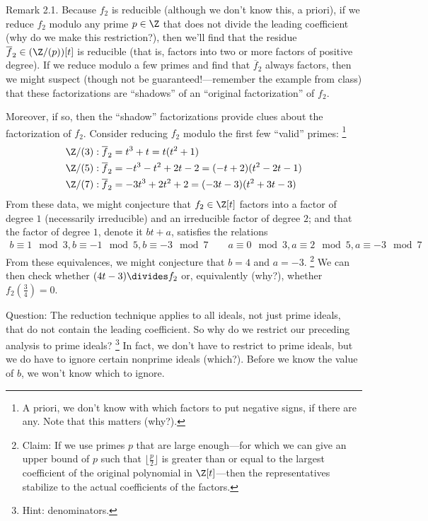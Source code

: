 {Remark 2.1. Because $f_{2}$ is reducible (although we don't know this, a priori), if we reduce $f_{2}$ modulo any prime $p \in \Z$ that does not divide the leading coefficient (why do we make this restriction?), then we'll find that the residue $\overline{f}_{2} \in (\Z / (p))[t]$ is reducible (that is, factors into two or more factors of positive degree). If we reduce modulo a few primes and find that $\overline{f}_{2}$ always factors, then we might suspect (though not be guaranteed!---remember the example from class) that these factorizations are ``shadows'' of an ``original factorization'' of $f_{2}$.

Moreover, if so, then the ``shadow'' factorizations provide clues about the factorization of $f_{2}$. Consider reducing $f_{2}$ modulo the first few ``valid'' primes:%
\footnote{A priori, we don't know with which factors to put negative signs, if there are any. Note that this matters (why?).}%
\begin{align*}
\Z / (3)
:
\overline{f}_{2}
&=
t^{3} + t
=
t (t^{2} + 1)
\\
\Z / (5)
:
\overline{f}_{2}
&=
-t^{3} - t^{2} + 2 t - 2
=
(-t + 2) (t^{2} - 2 t - 1)
\\
\Z / (7)
:
\overline{f}_{2}
&=
-3 t^{3} + 2 t^{2} + 2
=
(-3 t - 3) (t^{2} + 3 t - 3)
\end{align*}
From these data, we might conjecture that $f_{2} \in \Z[t]$ factors into a factor of degree $1$ (necessarily irreducible) and an irreducible factor of degree $2$; and that the factor of degree $1$, denote it $b t + a$, satisfies the relations
\begin{align*}
b
\equiv
1
\mod 3,
b
\equiv
-1
\mod 5,
b
\equiv
-3
\mod 7
\qquad
a
\equiv
0
\mod 3,
a
\equiv
2
\mod 5,
a
\equiv
-3
\mod 7
\end{align*}
From these equivalences, we might conjecture that $b = 4$ and $a = -3$.%
\footnote{Claim: If we use primes $p$ that are large enough---for which we can give an upper bound of $p$ such that $\lfloor{}\frac{p}{2}\rfloor{}$ is greater than or equal to the largest coefficient of the original polynomial in $\Z[t]$---then the representatives stabilize to the actual coefficients of the factors.} %
We can then check whether $(4 t - 3) \divides f_{2}$ or, equivalently (why?), whether $f_{2}(\frac{3}{4}) = 0$.

Question: The reduction technique applies to all ideals, not just prime ideals, that do not contain the leading coefficient. So why do we restrict our preceding analysis to prime ideals?%
\footnote{Hint: denominators.} %
In fact, we don't have to restrict to prime ideals, but we do have to ignore certain nonprime ideals (which?). Before we know the value of $b$, we won't know which to ignore.

}
